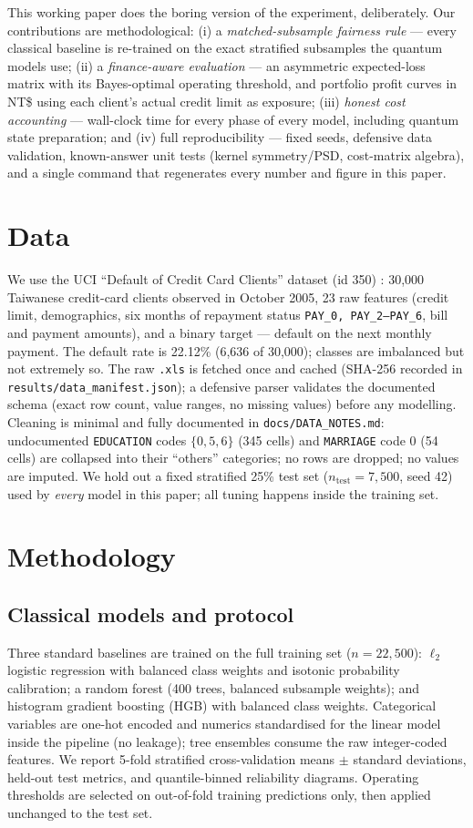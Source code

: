 \documentclass[11pt]{article}
\begin{document}
This working paper does the boring version of the experiment, deliberately.
Our contributions are methodological:
(i) a \emph{matched-subsample fairness rule} --- every classical baseline is
re-trained on the exact stratified subsamples the quantum models use;
(ii) a \emph{finance-aware evaluation} --- an asymmetric expected-loss matrix
with its Bayes-optimal operating threshold, and portfolio profit curves in
NT\$ using each client's actual credit limit as exposure;
(iii) \emph{honest cost accounting} --- wall-clock time for every phase of
every model, including quantum state preparation; and
(iv) full reproducibility --- fixed seeds, defensive data validation,
known-answer unit tests (kernel symmetry/PSD, cost-matrix algebra), and a
single command that regenerates every number and figure in this paper.

\section{Data}
We use the UCI ``Default of Credit Card Clients'' dataset (id 350)
\cite{yeh2009,uci}: 30{,}000 Taiwanese credit-card clients observed in
October 2005, 23 raw features (credit limit, demographics, six months of
repayment status \texttt{PAY\_0, PAY\_2--PAY\_6}, bill and payment amounts),
and a binary target --- default on the next monthly payment. The default rate
is 22.12\% (6,636 of 30,000); classes are imbalanced but not
extremely so. The raw \texttt{.xls} is fetched once and cached (SHA-256
recorded in \texttt{results/data\_manifest.json}); a defensive parser
validates the documented schema (exact row count, value ranges, no missing
values) before any modelling. Cleaning is minimal and fully documented in
\texttt{docs/DATA\_NOTES.md}: undocumented \texttt{EDUCATION} codes
$\{0,5,6\}$ (345 cells) and \texttt{MARRIAGE} code $0$ (54
cells) are collapsed into their ``others'' categories; no rows are dropped;
no values are imputed. We hold out a fixed stratified 25\% test set
($n_{\text{test}} = 7,500$, seed 42) used by \emph{every} model in this
paper; all tuning happens inside the training set.

\section{Methodology}
\subsection{Classical models and protocol}
Three standard baselines are trained on the full training set
($n = 22,500$): $\ell_2$ logistic regression with balanced class weights
and isotonic probability calibration; a random forest (400 trees, balanced
subsample weights); and histogram gradient boosting (HGB) with balanced class
weights. Categorical variables are one-hot encoded and numerics standardised
for the linear model inside the pipeline (no leakage); tree ensembles consume
the raw integer-coded features. We report 5-fold stratified cross-validation
means $\pm$ standard deviations, held-out test metrics, and quantile-binned
reliability diagrams. Operating thresholds are selected on out-of-fold
training predictions only, then applied unchanged to the test set.
\end{document}

